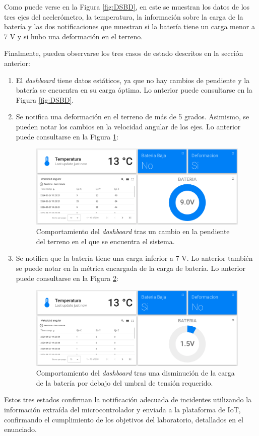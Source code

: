 Como puede verse en la Figura \ref{fig:DSBD}, en este se muestran los datos de los tres ejes del acelerómetro, la temperatura, la información sobre la carga de la batería y las dos notificaciones que muestran si la batería tiene un carga menor a 7 V y si hubo una deformación en el terreno. 

Finalmente, pueden observarse los tres casos de estado descritos en la sección anterior: 

\begin{enumerate}
    \item El \textit{dashboard} tiene datos estáticos, ya que no hay cambios de pendiente y la batería se encuentra en su carga óptima. Lo anterior puede consultarse en la Figura \ref{fig:DSBD}.

    \item Se notifica una deformación en el terreno de más de 5 grados. Asimismo, se pueden notar los cambios en la velocidad angular de los ejes. Lo anterior puede consultarse en la Figura \ref{fig:TH2}: 

    \begin{figure}[H]
    \centering
    \includegraphics[width=155mm]{./Figuras/Desarrollo_Analisis/TH2}
    \caption{Comportamiento del \textit{dashboard} tras un cambio en la pendiente del terreno en el que se encuentra el sistema.} 
    \label{fig:TH2}
    \end{figure}

    \item Se notifica que la batería tiene una carga inferior a 7 V. Lo anterior también se puede notar en la métrica encargada de la carga de batería. Lo anterior puede consultarse en la Figura \ref{fig:TH3}: 

    \begin{figure}[H]
    \centering
    \includegraphics[width=155mm]{./Figuras/Desarrollo_Analisis/TH3}
    \caption{Comportamiento del \textit{dashboard} tras una disminución de la carga de la batería por debajo del umbral de tensión requerido.} 
    \label{fig:TH3}
    \end{figure}
\end{enumerate}

Estos tres estados confirman la notificación adecuada de incidentes utilizando la información extraída del microcontrolador y enviada a la plataforma de IoT, confirmando el cumplimiento de los objetivos del laboratorio, detallados en el enunciado.  
